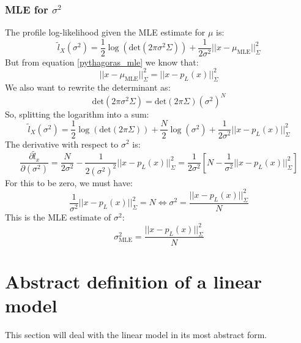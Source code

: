 \documentclass[12pt, a4paper]{article}
\begin{document}
\subsubsection{MLE for $\sigma^2$}
The profile log-likelihood given the MLE estimate for $\mu$ is:
\begin{equation}
\tilde{l}_X(\sigma^2)=\frac{1}{2}\log\left(\textrm{det}(2\pi\sigma^2\Sigma)\right)+\frac{1}{2\sigma^2}||x-\mu_{\textrm{MLE}}||^2_\Sigma
\end{equation}
But from equation \ref{pythagoras_mle} we know that:
\begin{equation}
||x-\mu_{\textrm{MLE}}||^2_\Sigma=||x-p_L(x)||^2_\Sigma
\end{equation}
We also want to rewrite the determinant as:
\begin{equation}
\textrm{det}(2\pi\sigma^2\Sigma)=\textrm{det}(2\pi\Sigma)(\sigma^2)^N
\end{equation}
So, splitting the logarithm into a sum:
\begin{equation}
\tilde{l}_X(\sigma^2)=\frac{1}{2}\log\left(\textrm{det}(2\pi\Sigma)\right)+\frac{N}{2}\log(\sigma^2)+\frac{1}{2\sigma^2}||x-p_L(x)||^2_\Sigma
\end{equation}
The derivative with respect to $\sigma^2$ is:
\begin{equation}
\frac{\partial\tilde{l}_x}{\partial(\sigma^2)}=\frac{N}{2\sigma^2}-\frac{1}{2(\sigma^2)^2}||x-p_L(x)||^2_\Sigma=\frac{1}{2\sigma^2}\left[N-\frac{1}{\sigma^2}||x-p_L(x)||^2_\Sigma\right]
\end{equation}
For this to be zero, we must have:
\begin{equation}
\frac{1}{\sigma^2}||x-p_L(x)||^2_\Sigma=N\Leftrightarrow\sigma^2=\frac{||x-p_L(x)||^2_\Sigma}{N}
\end{equation}
This is the MLE estimate of $\sigma^2$:
\begin{equation}
\sigma^2_{\textrm{MLE}}=\frac{||x-p_L(x)||^2_\Sigma}{N}
\end{equation}

\section{Abstract definition of a linear model}
This section will deal with the linear model in its most abstract form.
\end{document}
